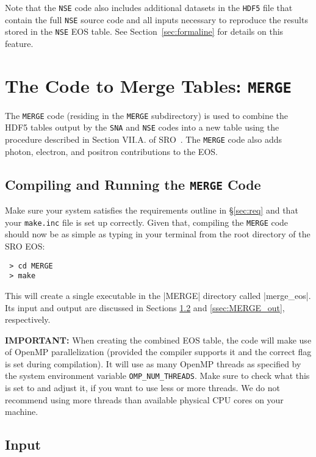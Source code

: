 \documentclass[letterpaper,11pt]{refart}
\begin{document}
\smallskip
Note that the \texttt{NSE} code also includes additional datasets in
the \texttt{HDF5} file that contain the full \texttt{NSE} source code
and all inputs necessary to reproduce the results stored in the
\texttt{NSE} EOS table. See Section~\ref{sec:formaline} for details on
this feature.


\section{The Code to Merge Tables: \texttt{MERGE}}
\label{sec:merge}


The \texttt{MERGE} code (residing in the \texttt{MERGE} subdirectory) 
is used to combine the HDF5 tables output by the \texttt{SNA} and 
\texttt{NSE} codes into a new table using the procedure described
in Section VII.A. of SRO~\cite{schneider:17}. The \texttt{MERGE} code
also adds photon, electron, and positron contributions to the EOS.


\subsection{Compiling and Running the \texttt{MERGE} Code}


Make sure your system satisfies the requirements outline in
\S\ref{sec:req} and that your \texttt{make.inc} file is set up
correctly. Given that, compiling the \verb|MERGE| code should now be
as simple as typing in your terminal from the root directory of the
SRO EOS:

\begin{verbatim}
 > cd MERGE
 > make
\end{verbatim}


This will create a single executable in the \verbfile|MERGE| 
directory called \verbexec|merge_eos|.  Its input and output are
discussed in Sections \ref{ssec:MERGE_in} and \ref{ssec:MERGE_out},
respectively. 


\textbf{IMPORTANT:} When creating the combined EOS table, the code
will make use of OpenMP parallelization (provided the compiler
supports it and the correct flag is set during compilation). It will
use as many OpenMP threads as specified by the system environment
variable \texttt{OMP\_NUM\_THREADS}. Make sure to check what this is
set to and adjust it, if you want to use less or more threads. We do
not recommend using more threads than available physical CPU cores on
your machine.


\subsection{Input}
\label{ssec:MERGE_in}
\end{document}
